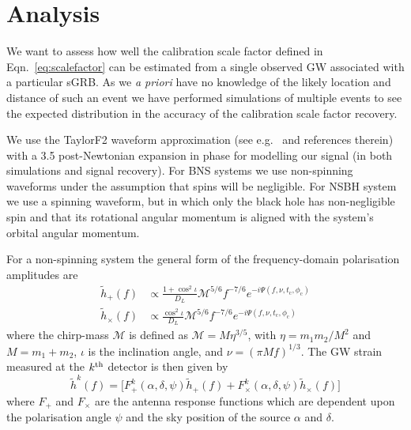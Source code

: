 \documentclass[10pt]{iopart}
\newcommand{\gws}{\tilde{h}}
\begin{document}
\section{Analysis}

We want to assess how well the calibration scale factor defined in Eqn.~\ref{eq:scalefactor} can be 
estimated from a single observed \ac{GW} associated with a particular \ac{sGRB}. As we {\it a 
priori} have no knowledge of the likely location and distance of such an event we have performed 
simulations of multiple events to see the expected distribution in the accuracy of the calibration 
scale factor recovery.

We use the TaylorF2 waveform approximation (see e.g.\ \cite{2009PhRvD..80h4043B} and references 
therein) with a 3.5 post-Newtonian expansion in phase for modelling our signal (in both simulations 
and signal recovery).  For \ac{BNS} systems we use non-spinning waveforms under the assumption that 
spins will be negligible. For \ac{NSBH} system we use a spinning waveform, but in which only the 
black hole has non-negligible spin and that its rotational angular momentum is aligned with the 
system's orbital angular momentum.

For a non-spinning system the general form of the frequency-domain polarisation amplitudes are
%
\begin{eqnarray}\label{eq:signal}
  \gws_{+}(f) &\propto \frac{1+\cos^{2}\iota}{D_{L}}
\mathcal{M}^{5/6}f^{-7/6}e^{-i\Psi(f, \nu, t_\mathrm{c}, \phi_{\mathrm{c}})} \nonumber \\
  \gws_{\times}(f) &\propto
 \frac{\cos^{2}\iota}{D_{L}}\mathcal{M}^{5/6} f^{-7/6}e^{-i\Psi(f, \nu, t_\mathrm{c}, 
\phi_{\mathrm{c}})}
\end{eqnarray}
%
where the chirp-mass $\mathcal{M}$ is defined as $\mathcal{M}=M\eta^{3/5}$, with 
$\eta=m_{1}m_{2}/M^{2}$ and $M=m_{1}+m_{2}$, $\iota$ is the inclination angle, and $\nu=(\pi 
Mf)^{1/3}$.  The \ac{GW} strain measured at the $k^{\rm{th}}$ detector is then given by
%
\begin{equation}
  \label{eq:gravsig}
   \gws^{k}(f) = \big[ F_{+}^{k}(\alpha, \delta, \psi)\gws_{+}(f) +
F_{\times}^k(\alpha, \delta, \psi)\gws_{\times}(f)\big]
\end{equation}
%
where $F_{+}$ and $F_{\times}$ are the antenna response functions which are dependent upon the 
polarisation angle $\psi$ and the sky position of the source $\alpha$ and $\delta$.
\end{document}
